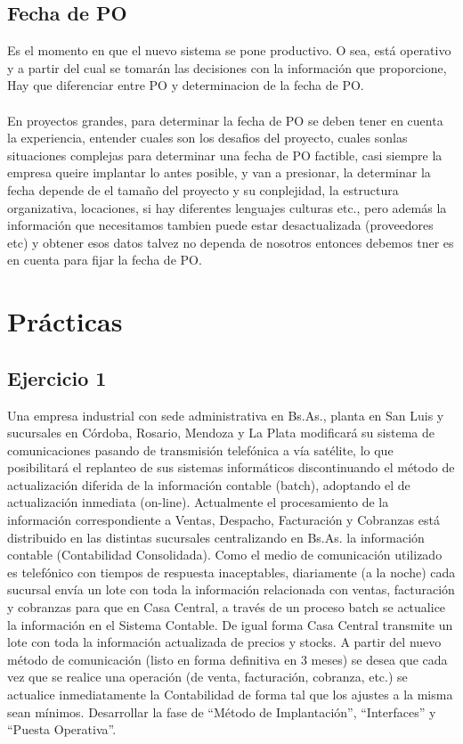 \documentclass[12pt]{book}
\begin{document}
\section{Fecha de PO}
Es el momento en que el nuevo sistema se pone productivo. O sea, está operativo y a partir del cual se
tomarán las decisiones con la información que proporcione, Hay que diferenciar entre PO y determinacion de la fecha de PO.
\\ \\
En proyectos grandes, para determinar la fecha de PO se deben tener en cuenta la experiencia, entender cuales son los desafios del proyecto, cuales sonlas situaciones complejas
para determinar una fecha de PO factible, casi siempre la empresa queire implantar lo antes posible, y van a presionar,
la determinar la fecha depende de el tamaño del proyecto y su conplejidad, la estructura organizativa, locaciones, si hay diferentes lenguajes
culturas etc., pero además la información  que necesitamos tambien puede estar desactualizada (proveedores etc) y obtener esos datos
talvez no dependa de nosotros entonces debemos tner es en cuenta para fijar la fecha de PO.





\chapter{Prácticas}
\section{Ejercicio 1}
Una empresa industrial con sede administrativa en Bs.As., planta en San Luis y sucursales en
Córdoba, Rosario, Mendoza y La Plata modificará su sistema de comunicaciones pasando de
transmisión telefónica a vía satélite, lo que posibilitará el replanteo de sus sistemas informáticos
discontinuando el método de actualización diferida de la información contable (batch),
adoptando el de actualización inmediata (on-line). Actualmente el procesamiento de la
información correspondiente a Ventas, Despacho, Facturación y Cobranzas está distribuido en
las distintas sucursales centralizando en Bs.As. la información contable (Contabilidad
Consolidada). Como el medio de comunicación utilizado es telefónico con tiempos de respuesta
inaceptables, diariamente (a la noche) cada sucursal envía un lote con toda la información
relacionada con ventas, facturación y cobranzas para que en Casa Central, a través de un proceso
batch se actualice la información en el Sistema Contable. De igual forma Casa Central transmite
un lote con toda la información actualizada de precios y stocks. A partir del nuevo método de
comunicación (listo en forma definitiva en 3 meses) se desea que cada vez que se realice una
operación (de venta, facturación, cobranza, etc.) se actualice inmediatamente la Contabilidad
de forma tal que los ajustes a la misma sean mínimos.
Desarrollar la fase de “Método de Implantación”, “Interfaces” y “Puesta Operativa”.
\end{document}
